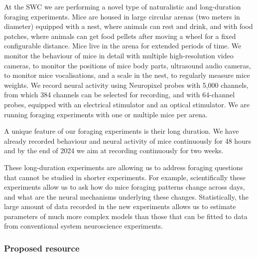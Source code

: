At the SWC we are performing a novel type of naturalistic and long-duration
foraging experiments. Mice are housed in large circular arenas (two meters in diameter)
equipped with a nest, where animals can rest and drink, and with food patches,
where animals can get food pellets after moving a wheel for a fixed
configurable distance. Mice live in the arena for extended periods of time. We
monitor the behaviour of mice in detail with multiple high-resolution video
cameras, to monitor the positions of mice body parts, ultrasound audio cameras,
to monitor mice vocalisations, and a scale in the nest, to regularly measure
mice weights. We record neural activity using Neuropixel probes with 5,000
channels, from which 384 channels can be selected for recording, and with
64-channel probes, equipped with an electrical stimulator and an optical
stimulator.
%
We are running foraging experiments with one or multiple mice per arena.

A unique feature of our foraging experiments is their long duration. We have
already recorded behaviour and neural activity of mice continuously for 48 hours
and by the end of 2024 we aim at recording continuously for two weeks.

These long-duration experiments are allowing us to address foraging questions
that cannot be studied in shorter experiments. For example, scientifically
these experiments allow us to ask how do mice foraging patterns change across
days, and what are the neural mechanisms underlying these changes.
Statistically, the large amount of data recorded in the new experiments allows
us to estimate parameters of much more complex models than those that can be
fitted to data from conventional system neuroscience experiments.



\subsubsection*{Proposed resource}


